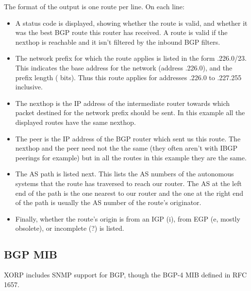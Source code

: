 The format of the output is one route per line.  On each line:
\begin{itemize}
\item A status code is displayed, showing whether the route is valid,
  and whether it was the best BGP route this router has received.  A
  route is valid if the nexthop is reachable and it isn't filtered by
  the inbound BGP filters.
\item The network prefix for which the route applies is listed in the
  form {.226.0/23}.  This indicates the base address for the
  network (address {.226.0}), and the prefix length ({} bits).
  Thus this route applies for addresses {.226.0} to {.227.255} inclusive.
\item The nexthop is the IP address of the intermediate router towards
  which packet destined for the network prefix should be sent.  In
  this example all the displayed routes have the same nexthop.
\item The peer is the IP address of the BGP router which sent us this
  route.  The nexthop and the peer need not the the same (they often
  aren't with IBGP peerings for example) but in all the routes in this
  example they are the same.
\item The AS path is listed next.  This lists the AS numbers of the
  autonomous systems that the route has traversed to reach our
  router.  The AS at the left end of the path is the one nearest to
  our router and the one at the right end of the path is usually the
  AS number of the route's originator.  
\item Finally, whether the route's origin is from an IGP ({\stt i}),
  from EGP ({\stt e}, mostly obsolete), or incomplete ({\stt ?}) is
  listed.
\end{itemize}

\subsection{BGP MIB}

XORP includes SNMP support for BGP, though the BGP-4 MIB defined in
RFC 1657.
